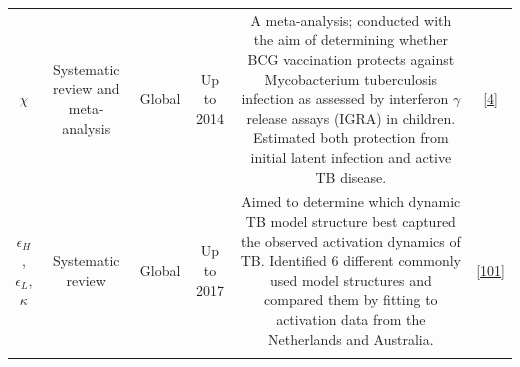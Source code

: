 \documentclass[11pt,twoside]{bristolthesis}
\begin{document}
\begin{longtable}[]{@{}cccccc@{}}
\begin{minipage}[t]{0.19\columnwidth}
  \(\chi\)\strut
  \end{minipage} & \begin{minipage}[t]{0.09\columnwidth}\centering
  Systematic
  review and
  meta-analysis\strut
  \end{minipage} & \begin{minipage}[t]{0.07\columnwidth}\centering
  Global\strut
  \end{minipage} & \begin{minipage}[t]{0.07\columnwidth}\centering
  Up to
  2014\strut
  \end{minipage} & \begin{minipage}[t]{0.31\columnwidth}\centering
  A meta-analysis; conducted with the aim of
  determining whether BCG vaccination protects
  against Mycobacterium tuberculosis infection as
  assessed by interferon \(\gamma\) release assays
  (IGRA) in children. Estimated both protection from
  initial latent infection and active TB disease.\strut
  \end{minipage} & \begin{minipage}[t]{0.10\columnwidth}\centering
  {[}\protect\hyperlink{ref-Roy2014}{4}{]}\strut
  \end{minipage}\tabularnewline
  \begin{minipage}[t]{0.19\columnwidth}\centering
  \(\epsilon_H\),
  \(\epsilon_L\),
  \(\kappa\)\strut
  \end{minipage} & \begin{minipage}[t]{0.09\columnwidth}\centering
  Systematic
  review\strut
  \end{minipage} & \begin{minipage}[t]{0.07\columnwidth}\centering
  Global\strut
  \end{minipage} & \begin{minipage}[t]{0.07\columnwidth}\centering
  Up to
  2017\strut
  \end{minipage} & \begin{minipage}[t]{0.31\columnwidth}\centering
  Aimed to determine which dynamic TB model
  structure best captured the observed activation
  dynamics of TB. Identified 6 different commonly
  used model structures and compared them by fitting
  to activation data from the Netherlands and
  Australia.\strut
  \end{minipage} & \begin{minipage}[t]{0.10\columnwidth}\centering
  {[}\protect\hyperlink{ref-Ragonnet2017}{101}{]}\strut
  \end{minipage}\tabularnewline
  \begin{minipage}[t]{0.19\columnwidth}\centering

\end{minipage}
\end{longtable}
\end{document}
